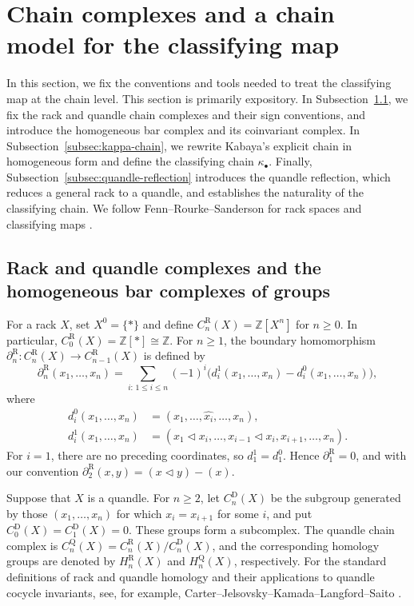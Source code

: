 \documentclass[10pt,a4paper]{amsart}
\newcommand{\ZZ}{\mathbb Z}
\newcommand{\R}{\mathrm R}
\newcommand{\Q}{\mathrm Q}
\newcommand{\D}{\mathrm D}
\begin{document}
\section{Chain complexes and a chain model for the classifying map}

In this section, we fix the conventions and tools needed to treat the classifying map at the chain level. This section is primarily expository. In Subsection~\ref{subsec:rack-quandle-complexes}, we fix the rack and quandle chain complexes and their sign conventions, and introduce the homogeneous bar complex and its coinvariant complex. In Subsection~\ref{subsec:kappa-chain}, we rewrite Kabaya's explicit chain in homogeneous form and define the classifying chain $\kappa_\bullet$. Finally, Subsection~\ref{subsec:quandle-reflection} introduces the quandle reflection, which reduces a general rack to a quandle, and establishes the naturality of the classifying chain. We follow Fenn--Rourke--Sanderson for rack spaces and classifying maps \cite{FRS}.

\subsection{Rack and quandle complexes and the homogeneous bar complexes of groups}
\label{subsec:rack-quandle-complexes}

For a rack $X$, set $X^0=\{*\}$ and define $C_n^\R(X)=\ZZ[X^n]$ for $n\ge0$. In particular, $C_0^\R(X)=\ZZ[*]\cong\ZZ$. For $n\ge1$, the boundary homomorphism $\partial_n^\R\colon C_n^\R(X)\to C_{n-1}^\R(X)$ is defined by
\[
\partial_n^\R(x_1,\ldots,x_n)
=
\sum_{i:\,1\le i\le n}(-1)^i
\bigl(d_i^1(x_1,\ldots,x_n)-d_i^0(x_1,\ldots,x_n)\bigr),
\]
where
\[
\begin{aligned}
 d_i^0(x_1,\ldots,x_n)
 &= (x_1,\ldots,\widehat{x_i},\ldots,x_n),\\
 d_i^1(x_1,\ldots,x_n)
 &= (x_1\lhd x_i,\ldots,x_{i-1}\lhd x_i,x_{i+1},\ldots,x_n).
\end{aligned}
\]
For $i=1$, there are no preceding coordinates, so $d_1^1=d_1^0$. Hence $\partial_1^\R=0$, and with our convention $\partial_2^\R(x,y)=(x\lhd y)-(x)$.

Suppose that $X$ is a quandle. For $n\ge2$, let $C_n^\D(X)$ be the subgroup generated by those $(x_1,\ldots,x_n)$ for which $x_i=x_{i+1}$ for some $i$, and put $C_0^\D(X)=C_1^\D(X)=0$. These groups form a subcomplex. The quandle chain complex is $C_n^\Q(X)=C_n^\R(X)/C_n^\D(X)$, and the corresponding homology groups are denoted by $H_n^\R(X)$ and $H_n^\Q(X)$, respectively. For the standard definitions of rack and quandle homology and their applications to quandle cocycle invariants, see, for example, Carter--Jelsovsky--Kamada--Langford--Saito \cite{CJKS}.
\end{document}
